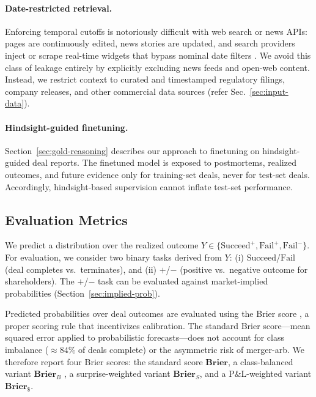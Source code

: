 \documentclass{article}
\theoremstyle{plain}
\theoremstyle{definition}
\theoremstyle{remark}
\newcommand{\Succeed}{\boldsymbol{\mathrm{Succeed}}}
\newcommand{\Fail}{\boldsymbol{\mathrm{Fail}}}
\newcommand{\Plus}{\boldsymbol{\mathrm{+}}}
\newcommand{\Minus}{\boldsymbol{\mathrm{-}}}
\newcommand{\SucceedPlus}{\boldsymbol{\mathrm{Succeed}^{+}}}
\newcommand{\FailPlus}{\boldsymbol{\mathrm{Fail}^{+}}}
\newcommand{\FailMinus}{\boldsymbol{\mathrm{Fail}^{-}}}
\begin{document}
\paragraph{Date-restricted retrieval.} Enforcing temporal cutoffs is notoriously difficult with web search or news APIs: pages are continuously edited, news stories are updated, and search providers inject or scrape real-time widgets that bypass nominal date filters \cite{alur2025aia}. We avoid this class of leakage entirely by explicitly excluding news feeds and open-web content. Instead, we restrict context to curated and timestamped regulatory filings, company releases, and other commercial data sources (refer Sec.~\ref{sec:input-data}).

\paragraph{Hindsight-guided finetuning.} Section~\ref{sec:gold-reasoning} describes our approach to finetuning on hindsight-guided deal reports. The finetuned model is exposed to postmortems, realized outcomes, and future evidence only for training-set deals, never for test-set deals. Accordingly, hindsight-based supervision cannot inflate test-set performance.


\subsection{Evaluation Metrics}

We predict a distribution over the realized outcome $Y \in \{\SucceedPlus,\FailPlus,\FailMinus\}$. For evaluation, we consider two
binary tasks derived from $Y$:
(i) $\Succeed$/$\Fail$ (deal completes vs.\ terminates), and
(ii) $\Plus$/$\Minus$ (positive vs.\ negative outcome for shareholders).
The $\Plus$/$\Minus$ task can be evaluated against market-implied probabilities (Section~\ref{sec:implied-prob}).

Predicted probabilities over deal outcomes are evaluated using the Brier score \cite{brier1950verification}, a proper scoring rule that incentivizes calibration. The standard Brier score—mean squared error applied to probabilistic forecasts—does not account for class imbalance ($\approx $$84\%$ of deals complete) or the asymmetric risk of merger-arb. 
We therefore report four Brier scores: the standard score $\textbf{Brier}$, a class-balanced variant $\textbf{Brier}_B$
\cite{pratt2024languagemodelsuseforecasting}, a surprise-weighted variant $\textbf{Brier}_S$, and a P\&L-weighted variant $\textbf{Brier}_{\$}$.
\end{document}
